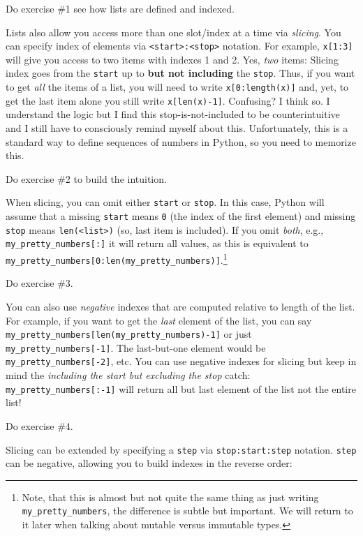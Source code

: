 \documentclass[
]{book}
\begin{document}
Do exercise \#1 see how lists are defined and indexed.

Lists also allow you access more than one slot/index at a time via \emph{slicing}. You can specify index of elements via \texttt{\textless{}start\textgreater{}:\textless{}stop\textgreater{}} notation. For example, \texttt{x{[}1:3{]}} will give you access to two items with indexes 1 and 2. Yes, \emph{two} items: Slicing index goes from the \texttt{start} up to \textbf{but not including} the \texttt{stop}. Thus, if you want to get \emph{all} the items of a list, you will need to write \texttt{x{[}0:length(x){]}} and, yet, to get the last item alone you still write \texttt{x{[}len(x)-1{]}}. Confusing? I think so. I understand the logic but I find this stop-is-not-included to be counterintuitive and I still have to consciously remind myself about this. Unfortunately, this is a standard way to define sequences of numbers in Python, so you need to memorize this.

Do exercise \#2 to build the intuition.

When slicing, you can omit either \texttt{start} or \texttt{stop}. In this case, Python will assume that a missing \texttt{start} means \texttt{0} (the index of the first element) and missing \texttt{stop} means \texttt{len(\textless{}list\textgreater{})} (so, last item is included). If you omit \emph{both}, e.g., \texttt{my\_pretty\_numbers{[}:{]}} it will return all values, as this is equivalent to \texttt{my\_pretty\_numbers{[}0:len(my\_pretty\_numbers){]}}.\footnote{Note, that this is almost but not quite the same thing as just writing \texttt{my\_pretty\_numbers}, the difference is subtle but important. We will return to it later when talking about mutable versus immutable types.}

Do exercise \#3.

You can also use \emph{negative} indexes that are computed relative to length of the list. For example, if you want to get the \emph{last} element of the list, you can say \texttt{my\_pretty\_numbers{[}len(my\_pretty\_numbers)-1{]}} or just \texttt{my\_pretty\_numbers{[}-1{]}}. The last-but-one element would be \texttt{my\_pretty\_numbers{[}-2{]}}, etc. You can use negative indexes for slicing but keep in mind the \emph{including the start but excluding the stop} catch: \texttt{my\_pretty\_numbers{[}:-1{]}} will return all but last element of the list not the entire list!

Do exercise \#4.

Slicing can be extended by specifying a \texttt{step} via \texttt{stop:start:step} notation. \texttt{step} can be negative, allowing you to build indexes in the reverse order:
\end{document}
